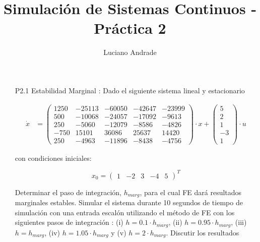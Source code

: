 \documentclass{article}
\begin{document}
\author{Luciano Andrade}
\title{Simulación de Sistemas Continuos - Práctica 2}
\maketitle

\begin{itemize}

  \item[P2.1] Estabilidad Marginal : Dado el siguiente sistema lineal y estacionario

\begin{align}
\dot{x} &= \begin{pmatrix}
  1250 & -25113 & -60050 & -42647 & -23999 \\
   500 & -10068 & -24057 & -17092 &  -9613 \\
   250 &  -5060 & -12079 &  -8586 &  -4826 \\
  -750 &  15101 &  36086 &  25637 &  14420 \\
   250 &  -4963 & -11896 &  -8438 &  -4756 
       \end{pmatrix} 
\cdot x +
\begin{pmatrix}
	5 \\
	2 \\
	1 \\
	-3 \\
 	1
	\end{pmatrix}
\cdot u 
 \label{P2.1a} \tag{P2.1a}
\end{align}

con condiciones iniciales:

\begin{equation}
x_0 = \begin{pmatrix}1 & -2 & 3 & -4 & 5 \end{pmatrix}^{T}
 \label{P2.1b} \tag{P2.1b}
\end{equation}

Determinar el paso de integración, $h_{marg}$, para el cual FE dará resultados marginales estables.
Simular el sistema durante 10 segundos de tiempo de simulación con una entrada escalón utilizando el método de FE con los siguientes pasos  de integración : (i) $h=0.1 \cdot h_{marg}$, (ii) $h=0.95 \cdot h_{marg}$, (iii) $h= h_{marg}$, (iv) $h= 1.05 \cdot h_{marg}$ y (v) $h=2 \cdot h_{marg}$. Discutir los resultados


\end{itemize}
\end{document}
